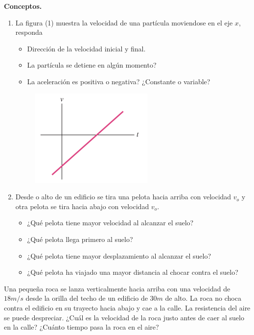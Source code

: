 \begin{mdframed}[style=warning]
	\begin{ejercicio}
		\textbf{Conceptos.}
		\begin{enumerate}
			\item La figura (1) muestra la velocidad de una partícula moviendose en el eje $x$, responda
			\begin{itemize}
				\item Dirección de la velocidad inicial y final.
				\item La partícula se detiene en algún momento?
				\item La aceleración es positiva o negativa? ¿Constante o variable? 
			\end{itemize}
			\begin{figure}[H]
				\centering
				\includegraphics[scale=0.5]{./img/pregunta.png}
				\caption{}
				\label{pre}
			\end{figure}
			\item Desde o alto de un edificio se tira una pelota hacia arriba con velocidad $v_o$ y otra pelota se tira hacia abajo con velocidad $v_o$.
			\begin{itemize}
				\item ¿Qué pelota tiene mayor velocidad al alcanzar el suelo?
				\item ¿Qué pelota llega primero al suelo?
				\item ¿Qué pelota tiene mayor desplazamiento al alcanzar el suelo?
				\item ¿Qué pelota ha viajado una mayor distancia al chocar contra el suelo?
			\end{itemize}
		\end{enumerate}
	\end{ejercicio}
\end{mdframed}





\begin{mdframed}[style=warning]
	\begin{ejercicio}
		Una pequeña roca se lanza verticalmente hacia arriba con una velocidad de $18m/s$ desde la orilla del techo de un edificio de $30m$ de alto. La roca no choca contra el edificio en su trayecto hacia abajo y cae a la calle. La resistencia del aire se puede despreciar. ¿Cuál es la velocidad de la roca justo antes de caer al suelo en la calle? ¿Cuánto tiempo pasa la roca en el aire?
	\end{ejercicio}
\end{mdframed}





